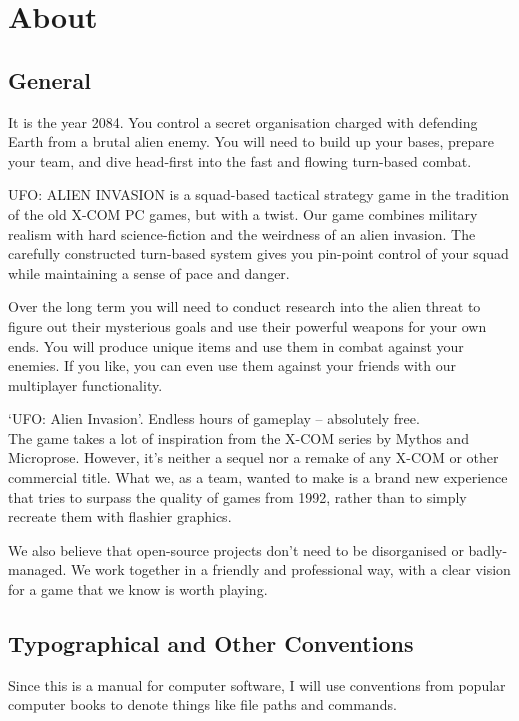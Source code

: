 

\section{About}
\subsection{General}
It is the year 2084. You control a secret organisation charged with defending Earth from a brutal alien enemy. You will need to build up your bases, prepare your team, and dive head-first into the fast and flowing turn-based combat.

UFO: ALIEN INVASION is a squad-based tactical strategy game in the tradition of the old X-COM PC games, but with a twist. Our game combines military realism with hard science-fiction and the weirdness of an alien invasion. The carefully constructed turn-based system gives you pin-point control of your squad while maintaining a sense of pace and danger.

Over the long term you will need to conduct research into the alien threat to figure out their mysterious goals and use their powerful weapons for your own ends. You will produce unique items and use them in combat against your enemies. If you like, you can even use them against your friends with our multiplayer functionality.

`UFO: Alien Invasion'. Endless hours of gameplay -- absolutely free.\\

The game takes a lot of inspiration from the X-COM series by Mythos and Microprose. However, it's neither a sequel nor a remake of any X-COM or other commercial title. What we, as a team, wanted to make is a brand new experience that tries to surpass the quality of games from 1992, rather than to simply recreate them with flashier graphics.

We also believe that open-source projects don't need to be disorganised or badly-managed. We work together in a friendly and professional way, with a clear vision for a game that we know is worth playing.

\subsection{Typographical and Other Conventions}
Since this is a manual for computer software, I will use conventions from popular computer books to denote things like file paths and commands.

